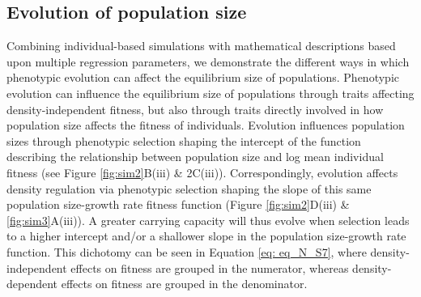 \documentclass{article}
\begin{document}
	\subsection{Evolution of population size}
	Combining individual-based simulations with mathematical descriptions based upon multiple regression parameters, we demonstrate the different ways in which phenotypic evolution can affect the equilibrium size of populations. Phenotypic evolution can influence the equilibrium size of populations through traits affecting density-independent fitness, but also through traits directly involved in how population size affects the fitness of individuals. Evolution influences population sizes through phenotypic selection shaping the intercept of the function describing the relationship between population size and log mean individual fitness (see Figure \ref{fig:sim2}B(iii) \& 2C(iii)). Correspondingly, evolution affects density regulation via phenotypic selection shaping the slope of this same population size-growth rate fitness function (Figure \ref{fig:sim2}D(iii) \& \ref{fig:sim3}A(iii)). A greater carrying capacity will thus evolve when selection leads to a higher intercept and/or a shallower slope in the population size-growth rate function. This dichotomy can be seen in Equation \ref{eq: eq_N_S7}, where density-independent effects on fitness are grouped in the numerator, whereas density-dependent effects on fitness are grouped in the denominator.
	
\end{document}
